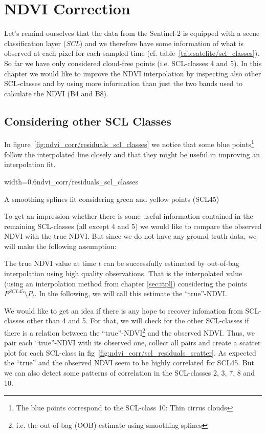 \chapter{NDVI Correction}

{
    Let's remind ourselves that the data from the Sentinel-2 is equipped with a scene classification layer (\textit{SCL}) and we therefore have some information of what is observed at each pixel for each sampled time (cf. table~\ref{tab:satelite/scl_classes}). So far we have only considered cloud-free points (i.e. SCL-classes 4 and 5). In this chapter we would like to improve the NDVI interpolation by inspecting also other SCL-classes and by using more information than just the two bands used to calculate the NDVI (B4 and B8).
}

\section{Considering other SCL Classes}{
    In figure~\ref{fig:ndvi_corr/residuals_scl_classes} we notice that some blue points\footnote{The blue points correspond to the SCL-class 10: Thin cirrus clouds} follow the interpolated line closely and that they might be useful in improving an interpolation fit.

    \begin{my_figure}[ht]{width=0.6\textwidth}{ndvi_corr/residuals_scl_classes}
        \caption{A smoothing splines fit considering green and yellow points (SCL45)}
        \label{fig:ndvi_corr/residuals_scl_classes}
    \end{my_figure}

    To get an impression whether there is some useful information contained in the remaining SCL-classes (all except 4 and 5) we would like to compare the observed NDVI with the true NDVI. But since we do not have any ground truth data, we will make the following assumption:

    \begin{assumption}{1}%
        \label{true_ndvi_assumption}
        The true NDVI value at time $t$ can be successfully estimated by out-of-bag interpolation using high quality observations. That is the interpolated value (using an interpolation method from chapter \ref{sec:itpl}) considering the points $P^{SCL45}\setminus P_t$. In the following, we will call this estimate the ``true''-NDVI.
    \end{assumption}

    We would like to get an idea if there is any hope to recover infomation from SCL-classes other than 4 and 5. For that, we will check for the other SCL-classes if there is a relation between the ``true''-NDVI\footnote{\label{footnote:truendvi} i.e. the out-of-bag (OOB) estimate using smoothing splines} and the observed NDVI. Thus, we pair each ``true''-NDVI with its observed one, collect all pairs and create a scatter plot for each SCL-class in fig~\ref{fig:ndvi_corr/scl_residuals_scatter}.
    As expected the ``true'' and the observed NDVI seem to be highly correlated for SCL45. But we can also detect some patterns of correlation in the SCL-classes 2, 3, 7, 8 and 10.  

}
